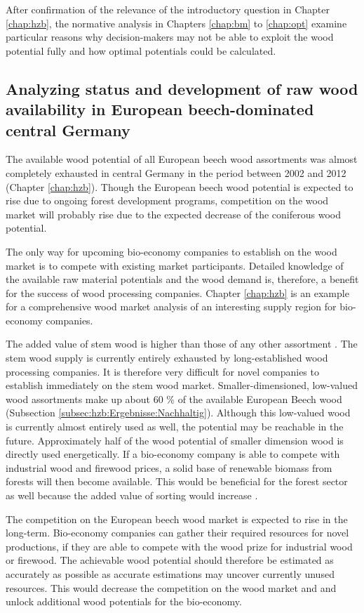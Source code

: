 After confirmation of the relevance of the introductory question in Chapter \ref{chap:hzb}, the normative analysis in Chapters \ref{chap:bm} to \ref{chap:opt} examine particular reasons why decision-makers may not be able to exploit the wood potential fully and how optimal potentials could be calculated.

\subsection{Analyzing status and development of raw wood availability in European beech-dominated central Germany}
\label{subsec:discussion:struct:hzb}
The available wood potential of all European beech wood assortments was almost completely exhausted in central Germany in the period between 2002 and 2012 (Chapter \ref{chap:hzb}). Though the European beech wood potential is expected to rise due to ongoing forest development programs, competition on the wood market will probably rise due to the expected decrease of the coniferous wood potential.

The only way for upcoming bio-economy companies to establish on the wood market is to compete with existing market participants. Detailed knowledge of the available raw material potentials and the wood demand is, therefore, a benefit for the success of wood processing companies. Chapter \ref{chap:hzb} is an example for a comprehensive wood market analysis of an interesting supply region for bio-economy companies.

The added value of stem wood is higher than those of any other assortment \citep{nagel_2008}. The stem wood supply is currently entirely exhausted by long-established wood processing companies. It is therefore very difficult for novel companies to establish immediately on the stem wood market. Smaller-dimensioned, low-valued wood assortments make up about 60 \% of the available European Beech wood (Subsection \ref{subsec:hzb:Ergebnisse:Nachhaltig}). Although this low-valued wood is currently almost entirely used as well, the potential may be reachable in the future. Approximately half of the wood potential of smaller dimension wood is directly used energetically. If a bio-economy company is able to compete with industrial wood and firewood prices, a solid base of renewable biomass from forests will then become available. This would be beneficial for the forest sector as well because the added value of sorting would increase \cite[p. 67]{mohring_1997}.

The competition on the European beech wood market is expected to rise in the long-term. Bio-economy companies can gather their required resources for novel productions, if they are able to compete with the wood prize for industrial wood or firewood. The achievable wood potential should therefore be estimated as accurately as possible as accurate estimations may uncover currently unused resources. This would decrease the competition on the wood market and and unlock additional wood potentials for the bio-economy.

